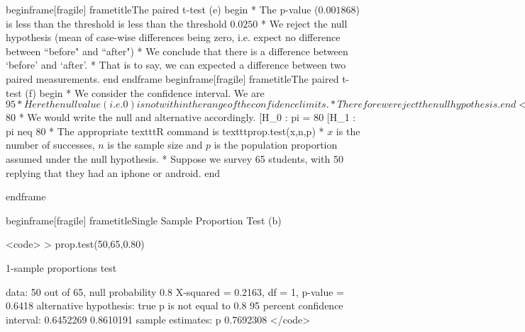 begin{frame}[fragile]
frametitle{The paired t-test (e)}
begin{ }
         * The p-value ($0.001868$) is less than the threshold is less than the threshold $0.0250$
         * We reject the null hypothesis (mean of case-wise differences being zero, i.e. expect no difference between ``before" and ``after")
         * We conclude that there is a difference between `before' and `after'.
         * That is to say, we can expected a difference between two paired measurements.
end{ }
end{frame}
begin{frame}[fragile]
frametitle{The paired t-test (f)}
begin{ }
         * We consider the confidence interval. We are $95%
         * Here the null value (i.e. 0) is not within the range of the confidence limits.
         * Therefore we reject the null hypothesis.
end{ }
<code>
> t.test(Before,After,paired=TRUE)
...
...
95 percent confidence interval:
  3.650075 12.778496
...
</code>
end{frame}
begin{frame}[fragile]
frametitle{Single Sample Proportion Test (a)}

begin{ }
         * In this procedure, we determine whether or not we are are justified in assuming that the population proportion takes a certain value.
         * For example, suppose we believed that the population proportion of students with iphones or androids was $80%
         * We would write the null and alternative accordingly.
[H_0 : pi = 80%
[H_1 : pi neq 80%
         * The  appropriate texttt{R} command is texttt{prop.test(x,n,p)}
         * $x$ is the number of successes, $n$ is the sample size and $p$ is the population proportion assumed under the null hypothesis.
         * Suppose we survey 65 students, with 50 replying that they had an iphone or android.
end{ }

end{frame}

begin{frame}[fragile]
frametitle{Single Sample Proportion Test (b)}

<code>
> prop.test(50,65,0.80)

        1-sample proportions test 

data:  50 out of 65, null probability 0.8
X-squared = 0.2163, df = 1, p-value = 0.6418
alternative hypothesis: true p is not equal to 0.8
95 percent confidence interval:
 0.6452269 0.8610191
sample estimates:
        p
0.7692308
</code>

